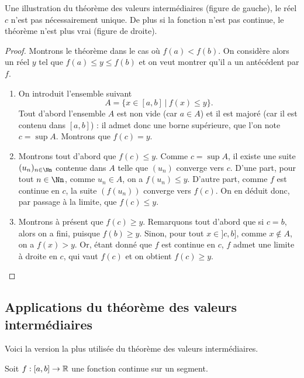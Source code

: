 \documentclass[class=report,crop=false]{standalone}
\begin{document}
Une illustration du théorème des valeurs intermédiaires 
(figure de gauche), le réel $c$ n'est pas nécessairement unique.
De plus si la fonction n'est pas continue, le théorème n'est plus vrai (figure de droite).

\begin{proof}
Montrons le théorème dans le cas où $f(a)<f(b)$. On considère alors un réel $y$ tel que
$f(a)\leq y\leq f(b)$ et on veut montrer qu'il a un antécédent par $f$.

\begin{enumerate}
\item On introduit l'ensemble suivant
\[
A=\Big\{ x\in [a,b] \ \vert \ f(x)\leq y \Big\}.
\]
Tout d'abord l'ensemble $A$ est non vide (car $a\in A$) et il est majoré (car il est
contenu dans $[a,b] $) : il admet donc une borne supérieure, que l'on note
$c=\sup A$. Montrons que $f(c)=y$.


\item Montrons tout d'abord que $f(c)\leq y$. Comme $c=\sup A$, il existe une suite
$(u_n)_{n\in\Nn}$ contenue dans $A$ telle que $(u_n)$ converge vers $c$.
D'une part, pour tout $n\in\Nn$, comme $u_n\in A$, on a $f(u_n)\leq y$.
D'autre part, comme $f$ est continue en $c$, la suite $\left(f(u_n)\right)$
converge vers $f(c)$. On en déduit donc, par passage à la limite, que $f(c)\leq y$.

\item Montrons à présent que $f(c)\geq y$. Remarquons tout d'abord que si $c=b$,
alors on a fini, puisque $f(b)\geq y$. Sinon, pour tout $x\in]c,b]$, comme $x\notin A$,
on a $f(x)>y$. Or, étant donné que $f$ est continue en $c$, $f$ admet une limite à droite
en $c$, qui vaut $f(c)$ et on obtient $f(c)\geq y$.
\end{enumerate}
\end{proof}

\subsection{Applications du théorème des valeurs intermédiaires}

Voici la version la plus utilisée du théorème des valeurs intermédiaires.
\begin{corollaire}
Soit $f:[a,b]\to\mathbb{R}$ une fonction continue sur un segment.
\mybox{Si $f(a)\cdot f(b)<0$, alors il existe $c\in]a,b[$ tel que $f(c)=0$.}
\end{corollaire}
\end{document}

